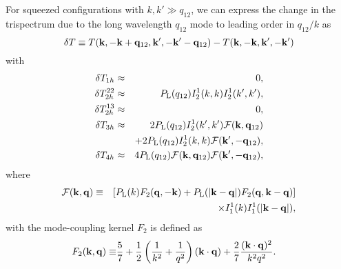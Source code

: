 \documentclass[prd,twocolumn,amsmath,amssymb,floatfix,superscriptaddress]{revtex4-1}
\newcommand{\bk}{{\bf k}}
\newcommand{\bq}{{\bf q}}
\newcommand{\lin}{{\rm L}}
\newcommand{\fpole}{{\cal F}}
\begin{document}
For squeezed configurations with $k,k'\gg q_{12}$, we can express the change in the
trispectrum due to the long wavelength $q_{12}$ mode to leading order in $q_{12}/k$ 
as
\begin{equation}
\delta T \equiv T(\bk,-\bk+\bq_{12},\bk',-\bk'-\bq_{12})-T(\bk,-\bk,\bk',-\bk')
\end{equation}
with
\begin{eqnarray}
\delta T_{1h}
&\approx & 0,
\nonumber\\
 \delta T_{2h}^{22} &\approx & 
P_\lin(q_{12})I^1_2(k,k)I^1_2(k',k'),
\nonumber\\
 \delta T_{2h}^{13} &\approx &  0,
\nonumber\\
 \delta  T_{3h} 
&\approx& 
2P_\lin(q_{12}) I^1_2(k',k') \fpole(\bk,\bq_{12}) \nonumber\\
&& + 
2P_\lin(q_{12}) I^1_2(k,k) \fpole(\bk',-\bq_{12}),
\nonumber\\
\delta T_{4h}
&\approx&  
4 P_\lin(q_{12})  \fpole(\bk,\bq_{12})  \fpole(\bk',-\bq_{12}),
\label{eq:Thm}
\end{eqnarray}
where
\begin{eqnarray}
\fpole(\bk,\bq) &\equiv&
 [ P_\lin(k) F_2(\bq,-\bk) + P_\lin(|\bk -\bq|) F_2(\bq,\bk-\bq) ] \nonumber\\
&& \times  I_1^1(k) I_1^1(|\bk -\bq|),
\end{eqnarray}
with the 
mode-coupling kernel $F_2$ is defined as
%
\begin{align}
F_2(\bk,\bq) \equiv &\frac{5}{7}+\frac{1}{2}
\left(\frac{1}{k^2}+\frac{1}{q^2}\right)(\bk \cdot\bq)
+\frac{2}{7}\frac{(\bk \cdot\bq)^2}{k^2 q^2}.
\end{align}
%
\end{document}
